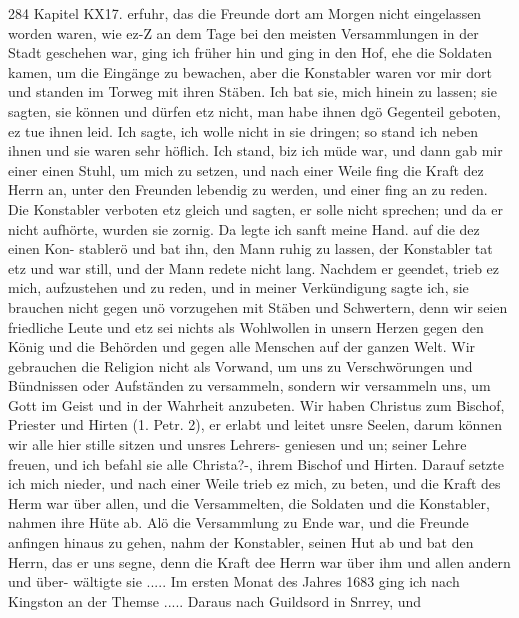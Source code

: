284 Kapitel KX17.
erfuhr, das die Freunde dort am Morgen nicht eingelassen worden
waren, wie ez-Z an dem Tage bei den meisten Versammlungen in
der Stadt geschehen war, ging ich früher hin und ging in den
Hof, ehe die Soldaten kamen, um die Eingänge zu bewachen,
aber die Konstabler waren vor mir dort und standen im Torweg
mit ihren Stäben. Ich bat sie, mich hinein zu lassen; sie sagten,
sie können und dürfen etz nicht, man habe ihnen dgö Gegenteil
geboten, ez tue ihnen leid. Ich sagte, ich wolle nicht in sie
dringen; so stand ich neben ihnen und sie waren sehr höflich.
Ich stand, biz ich müde war, und dann gab mir einer einen
Stuhl, um mich zu setzen, und nach einer Weile fing die Kraft
dez Herrn an, unter den Freunden lebendig zu werden, und
einer fing an zu reden. Die Konstabler verboten etz gleich und
sagten, er solle nicht sprechen; und da er nicht aufhörte, wurden
sie zornig. Da legte ich sanft meine Hand. auf die dez einen Kon-
stablerö und bat ihn, den Mann ruhig zu lassen, der Konstabler tat
etz und war still, und der Mann redete nicht lang. Nachdem er
geendet, trieb ez mich, aufzustehen und zu reden, und in meiner
Verkündigung sagte ich, sie brauchen nicht gegen unö vorzugehen
mit Stäben und Schwertern, denn wir seien friedliche Leute und
etz sei nichts als Wohlwollen in unsern Herzen gegen den König
und die Behörden und gegen alle Menschen auf der ganzen Welt.
Wir gebrauchen die Religion nicht als Vorwand, um uns zu
Verschwörungen und Bündnissen oder Aufständen zu versammeln,
sondern wir versammeln uns, um Gott im Geist und in der
Wahrheit anzubeten. Wir haben Christus zum Bischof, Priester
und Hirten (1. Petr. 2), er erlabt und leitet unsre Seelen, darum
können wir alle hier stille sitzen und unsres Lehrers- geniesen und
un; seiner Lehre freuen, und ich befahl sie alle Christa?-, ihrem
Bischof und Hirten. Darauf setzte ich mich nieder, und nach einer
Weile trieb ez mich, zu beten, und die Kraft des Herm war über
allen, und die Versammelten, die Soldaten und die Konstabler,
nahmen ihre Hüte ab. Alö die Versammlung zu Ende war, und
die Freunde anfingen hinaus zu gehen, nahm der Konstabler,
seinen Hut ab und bat den Herrn, das er uns segne, denn die
Kraft dee Herrn war über ihm und allen andern und über-
wältigte sie .....
Im ersten Monat des Jahres 1683 ging ich nach Kingston
an der Themse ..... Daraus nach Guildsord in Snrrey, und



